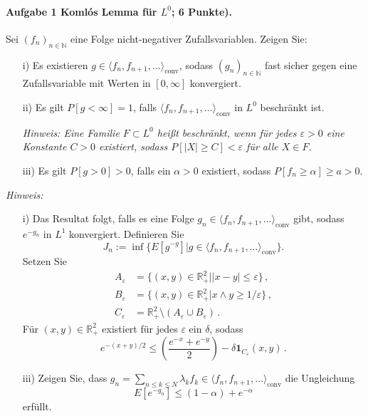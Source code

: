 \documentclass{article}
\begin{document}
\paragraph{Aufgabe 1 \textnormal{Komlós Lemma für $L^0$; 6 Punkte)}.}
Sei $(f_n)_{n\in\mathbb{N}}$ eine Folge nicht-negativer Zufallsvariablen. Zeigen Sie:
\begin{enumerate}
\item [i)] Es existieren $g\in\langle f_n,f_{n+1},\dots\rangle_\text{conv}$, sodass $(g_n)_{n\in\mathbb{N}}$ fast sicher gegen eine Zufallsvariable mit Werten in $[0,\infty]$ konvergiert.
\item [ii)] Es gilt $P[g<\infty]=1$, falls $\langle f_n,f_{n+1},\dots\rangle_\text{conv}$ in $L^0$ beschränkt ist.

  \emph{Hinweis: Eine Familie $F\subset L^0$ heißt beschränkt, wenn für jedes $\varepsilon>0$ eine Konstante $C>0$ existiert, sodass $P[|X|\geq C]<\varepsilon$ für alle $X\in F$.}
  
\item [iii)] Es gilt $P[g>0]>0$, falls ein $\alpha>0$ existiert, sodass $P[f_n\geq \alpha]\geq a>0$.
\end{enumerate}
\emph{Hinweis:}
\begin{enumerate}
\item [i)] Das Resultat folgt, falls es eine Folge $g_n\in\langle f_n,f_{n+1},\dots\rangle_\text{conv}$ gibt, sodass $e^{-g_n}$ in $L^1$ konvergiert.
  Definieren Sie
  \[
    J_n:= \inf\{E[g^{-g}]|g\in\langle f_n,f_{n+1},\dots\rangle_\text{conv}\}.
  \]
  Setzen Sie
  \begin{align*}
    A_\varepsilon
    &=\{(x,y)\in\mathbb{R}_+^2\big||x-y|\leq\varepsilon\}\,,\\
    B_\varepsilon
    &=\{(x,y)\in\mathbb{R}_+^2\big| x\wedge y\geq 1/\varepsilon\}\,,\\
    C_\varepsilon
    &=\mathbb{R}_+^2\setminus(A_\varepsilon \cup B_\varepsilon)\,.
  \end{align*}
Für $(x,y)\in\mathbb{R}_+^2$ existiert für jedes $\varepsilon$ ein $\delta$, sodass
\begin{equation}
  e^{-(x+y)/2}\leq\left(\frac{e^{-x}+e^{-y}}{2}\right)-\delta\mathbf{1}_{C_\varepsilon}(x,y)\,.\label{eq:ceineq}
\end{equation}
\item [iii)] Zeigen Sie, dass $g_n=\sum_{n\leq k\leq N}\lambda_k f_k\in\langle f_n,f_{n+1},\dots\rangle_\text{conv}$ die Ungleichung
  \[
    E[e^{-g_n}]\leq(1-\alpha)+e^{-\alpha}
  \]
  erfüllt.
\end{enumerate}
\end{document}
